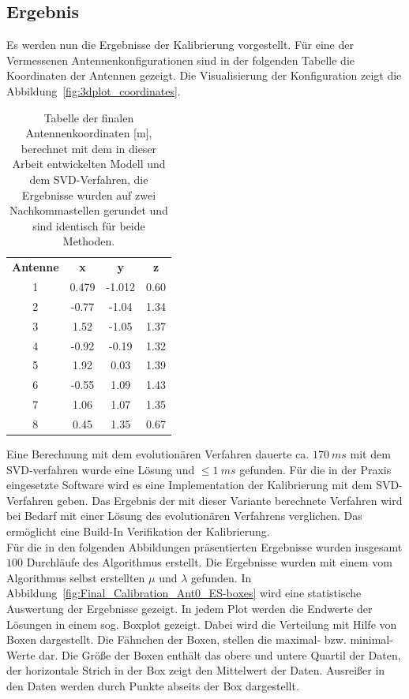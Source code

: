 \subsection{Ergebnis}
Es werden nun die Ergebnisse der Kalibrierung vorgestellt. Für eine der Vermessenen Antennenkonfigurationen sind in der folgenden Tabelle die Koordinaten der Antennen gezeigt. Die Visualisierung der Konfiguration zeigt die Abbildung~\ref{fig:3dplot_coordinates}.
%
\begin{table} [!ht]
	\begin{center}
		\begin{tabular}{cccc}
		      \textbf{Antenne} & \textbf{x} & \textbf{y} & \textbf{z} \\
		      1 &	0.479	&	-1.012 & 0.60 \\
		      2 &	-0.77 	&	-1.04 & 1.34 \\
		      3 &	1.52  	&	-1.05 & 1.37 \\
		      4 &	-0.92 	&	-0.19 & 1.32 \\
		      5 &	1.92 	&	0.03 & 1.39 \\
		      6 &	-0.55 	&	1.09 & 1.43 \\
		      7 &	1.06 	&	1.07 & 1.35 \\
		      8 &	0.45 	&	1.35 & 0.67 \\
%		      
		\end{tabular}
		\caption[Finale Antennen Koordinaten]{Tabelle der finalen Antennenkoordinaten [m], berechnet mit dem in dieser Arbeit entwickelten Modell und dem SVD-Verfahren, die Ergebnisse wurden auf zwei Nachkommastellen gerundet und sind identisch für beide Methoden.}
		\label{tab:FinalCoords}
	\end{center}
\end{table}
%
Eine Berechnung mit dem evolutionären Verfahren dauerte ca. $170~ms$ mit dem SVD-verfahren wurde eine Lösung und $\le 1~ms$ gefunden. Für die in der Praxis eingesetzte Software wird es eine Implementation der Kalibrierung mit dem SVD-Verfahren geben. Das Ergebnis der mit dieser Variante berechnete Verfahren wird bei Bedarf mit einer Lösung des evolutionären Verfahrens verglichen. Das ermöglicht eine Build-In Verifikation der Kalibrierung.\\

Für die in den folgenden Abbildungen präsentierten Ergebnisse wurden insgesamt $100$ Durchläufe des Algorithmus erstellt. Die Ergebnisse wurden mit einem vom Algorithmus selbst erstellten $\mu$ und $\lambda$ gefunden. In Abbildung~\ref{fig:Final_Calibration_Ant0_ES-boxes} wird eine statistische Auswertung der Ergebnisse gezeigt. In jedem Plot werden die Endwerte der Lösungen in einem sog. Boxplot gezeigt. Dabei wird die Verteilung mit Hilfe von Boxen dargestellt. Die Fähnchen der Boxen, stellen die maximal- bzw. minimal-Werte dar. Die Größe der Boxen enthält das obere und untere Quartil der Daten, der horizontale Strich in der Box zeigt den Mittelwert der Daten. Ausreißer in den Daten werden durch Punkte abseits der Box dargestellt.\\
%

